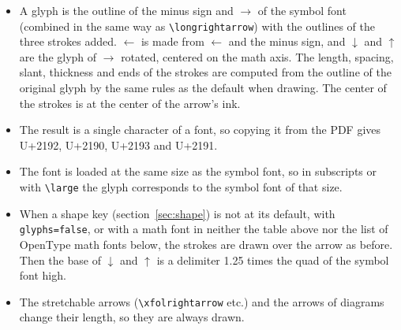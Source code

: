 \documentclass[dvipdfmx,a4paper]{article}
\begin{document}
\begin{itemize}
\item A glyph is the outline of the minus sign and $\rightarrow$ of the symbol font (combined
  in the same way as \verb|\longrightarrow|) with the outlines of the three strokes added.
  $\leftarrow$ is made from $\leftarrow$ and the minus sign, and $\downarrow$ and $\uparrow$ are
  the glyph of $\rightarrow$ rotated, centered on the math axis. The length, spacing, slant,
  thickness and ends of the strokes are computed from the outline of the original glyph by the
  same rules as the default when drawing. The center of the strokes is at the center of the
  arrow's ink.
\item The result is a single character of a font, so copying it from the PDF gives
  U+2192, U+2190, U+2193 and U+2191.
\item The font is loaded at the same size as the symbol font, so in subscripts or with
  \verb|\large| the glyph corresponds to the symbol font of that size.
\item When a shape key (section~\ref{sec:shape}) is not at its default, with
  \verb|glyphs=false|, or with a math font in neither the table above nor the list of OpenType
  math fonts below, the strokes are drawn over the arrow as before. Then the base of
  $\downarrow$ and $\uparrow$ is a delimiter 1.25 times the quad of the symbol font high.
\item The stretchable arrows (\verb|\xfolrightarrow| etc.) and the arrows of diagrams change
  their length, so they are always drawn.
\end{itemize}
\end{document}
